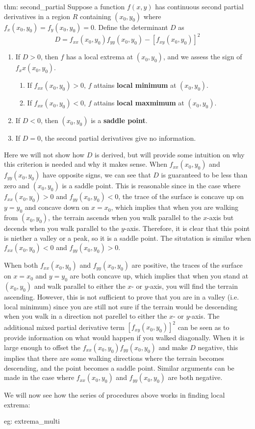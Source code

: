 \begin{theo}{thm: second_partial}
    Suppose a function $f(x, y)$ has continuous second partial derivatives in a region $R$ containing $(x_0, y_0)$ where $f_x(x_0, y_0) = f_y(x_0, y_0) = 0$.  Define the determinant $D$ as
    \[D = f_{xx}(x_0, y_0)f_{yy}(x_0, y_0) - [f_{xy}(x_0, y_0)]^2\]
    \begin{enumerate}
        \item If $D > 0$, then $f$ has a local extrema at $(x_0,y_0)$, and we assess the sign of $f_xx(x_0,y_0)$.
        \begin{enumerate}
            \item If $f_{xx}(x_0,y_0) > 0$, $f$ attains \textbf{local minimum} at $(x_0, y_0)$.
            \item If $f_{xx}(x_0,y_0) < 0$, $f$ attains \textbf{local maxmimum} at $(x_0, y_0)$.
        \end{enumerate}
        \item If $D < 0$, then $(x_0, y_0)$ is a \textbf{saddle point}.
        \item If $D = 0$, the second partial derivatives give no information.
    \end{enumerate}
\end{theo}

Here we will not show how $D$ is derived, but will provide some intuition on why this criterion is needed and why it makes sense.  When $f_{xx}(x_0,y_0)$ and $f_{yy}(x_0,y_0)$ have opposite signs, we can see that $D$ is guaranteed to be less than zero and $(x_0, y_0)$ is a saddle point.  This is reasonable since in the case where $f_{xx}(x_0,y_0) > 0$ and $f_{yy}(x_0,y_0) <0$, the trace of the surface is concave up on $y = y_0$ and concave down on $x = x_0$, which implies that when you are walking from $(x_0, y_0)$, the terrain ascends when you walk parallel to the $x$-axis but decends when you walk parallel to the $y$-axis.  Therefore, it is clear that this point is niether a valley or a peak, so it is a saddle point.  The situtation is similar when $f_{xx}(x_0,y_0) < 0$ and $f_{yy}(x_0,y_0) > 0$.


When both $f_{xx}(x_0,y_0)$ and $f_{yy}(x_0,y_0)$ are positive, the traces of the surface on $x = x_0$ and $y = y_0$ are both concave up, which implies that when you stand at $(x_0, y_0)$ and walk parallel to either the $x$- or $y$-axis, you will find the terrain ascending.  However, this is not sufficient to prove that you are in a valley (i.e. local minimum) since you are still not sure if the terrain would be descending when you walk in a direction not parellel to either the $x$- or $y$-axis.  The additional mixed partial derivative term $[f_{xy}(x_0, y_0)]^2$ can be seen as to provide information on what would happen if you walked diagonally.  When it is large enough to offset the $f_{xx}(x_0,y_0)f_{yy}(x_0,y_0)$ and make $D$ negative, this implies that there are some walking directions where the terrain becomes descending, and the point becomes a saddle point.  Similar arguments can be made in the case where $f_{xx}(x_0,y_0)$ and $f_{yy}(x_0,y_0)$ are both negative.

We will now see how the series of procedures above works in finding local extrema:

\begin{eg}[]{eg: extrema_multi}

\end{eg}
